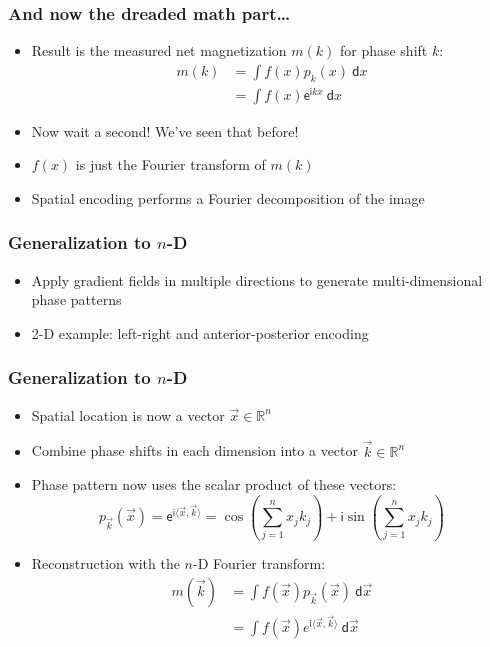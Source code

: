 \begin{frame}
	\frametitle{And now the dreaded math part\ldots}
	\begin{itemize}
		\item Result is the measured net magnetization $m(k)$ for phase shift $k$:
		\begin{align*}
			m(k) &= \int f(x)p_k(x)\ \mathsf dx \\
			     &= \int f(x)\mathsf e^{\mathsf ikx}\ \mathsf dx
		\end{align*}
		
		\item Now wait a second! We've seen that before!
		\item<2> $f(x)$ is just the Fourier transform of $m(k)$
		\item<2> Spatial encoding performs a Fourier decomposition of the image
	\end{itemize}
\end{frame}

\begin{frame}
	\frametitle{Generalization to $n$-D}
	
	\begin{itemize}
		\item Apply gradient fields in multiple directions to generate multi-dimensional phase patterns
		\item 2-D example: left-right and anterior-posterior encoding
	\end{itemize}
	\begin{center}
		\begingroup
		
		\endgroup
	\end{center}
\end{frame}

\begin{frame}
	\frametitle{Generalization to $n$-D}
	
	\begin{itemize}
		\item Spatial location is now a vector $\vec x \in \mathbb R^n$
		\item Combine phase shifts in each dimension into a vector $\vec k \in \mathbb R^n$
		\item Phase pattern now uses the scalar product of these vectors:
		$$p_{\vec k}(\vec x) = \mathsf e^{\mathsf i \langle \vec x, \vec k \rangle} = \cos\left( \sum_{j=1}^n x_j k_j \right) + \mathsf i \sin \left( \sum_{j=1}^n x_j k_j \right)$$
		\item Reconstruction with the $n$-D Fourier transform:
		\begin{align*}
			m(\vec k) &= \int f(\vec x) p_{\vec k}(\vec x)\ \mathsf d\vec x \\
			          &= \int f(\vec x) e^{\mathsf i \langle \vec x, \vec k \rangle}\ \mathsf d\vec x
		\end{align*}
	\end{itemize}
\end{frame}

